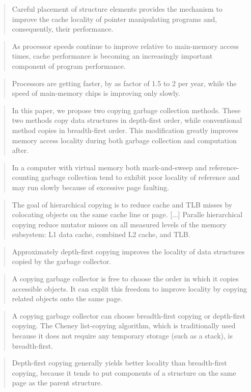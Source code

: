 \documentclass[a4paper,oneside]{memoir}
\begin{document}
\blockquote{Careful placement of structure elements provides the mechanism to
improve the cache locality of pointer manipulating programs and, consequently,
their performance.}
\cite{Chilimbi:1999}

\blockquote{As processor speeds continue to improve relative to main-memory
access times, cache performance is becoming an increasingly important component
of program performance.}
\cite{Reinhold:1994}

\blockquote{Processors are getting faster, by as factor of 1.5 to 2 per year,
while the speed of main-memory chips is improving only slowly.}
\cite{Reinhold:1994}

\blockquote{In this paper, we propose two copying garbage collection methods.
These two methods copy data structures in depth-first order, while conventional
method copies in breadth-first order. This modification greatly improves memory
access locality during both garbage collection and computation after.\cite{Nakashima:1995}}

\blockquote{In a computer with virtual memory both mark-and-sweep and
reference-counting garbage collection tend to exhibit poor locality of reference
and may run slowly because of excessive page faulting.}
\cite{Chase:1987}

\blockquote{The goal of hierarchical copying is to reduce cache and TLB misses
by colocating objects on the same cache line or page. [...] Paralle hierarchical
copying reduce mutator misses on all measured levels of the memory subsystem:
L1 data cache, combined L2 cache, and TLB.\cite{Siegwart:2006}}


\blockquote{Approximately depth-first copying improves the locality of
data structures copied by the garbage collector.}
\cite{Moon:1984}

\blockquote{A copying garbage collector is free to choose the order in which
it copies accessible objects. It can explit this freedom to improve locality by
copying related objects onto the same page.}
\cite{Moon:1984}

\blockquote{A copying garbage collector can choose breadth-first copying or
depth-first copying. The Cheney list-copying algorithm, which is traditionally
used because it does not require any temporary storage (such as a stack), is
breadth-first.\cite{Moon:1984}}


\blockquote{Depth-first copying generally yields better locality than
breadth-first copying, because it tends to put components of a structure on the
same page as the parent structure.}
\cite{Moon:1984}
\end{document}
